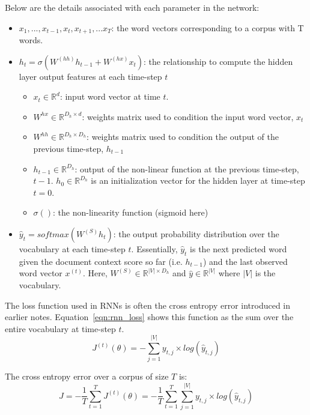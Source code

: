 \documentclass{tufte-handout}
\begin{document}
Below are the details associated with each parameter in the network:
\begin{itemize}
	\item $x_1, ..., x_{t-1}, x_t, x_{t+1}, ... x_{T}$: the word vectors corresponding to a corpus with T words.
	\item $h_t = \sigma(W^{(hh)} h_{t-1} + W^{(hx)} x_{t})$: the relationship to compute the hidden layer output features at each time-step $t$
	\begin{itemize}
		\item $x_{t} \in \mathbb{R}^{d}$: input word vector at time $t$. 
		\item $W^{hx} \in \mathbb{R}^{D_h \times d}$: weights matrix used to condition the input word vector, $x_t$
		\item $W^{hh} \in \mathbb{R}^{D_h \times D_h}$: weights matrix used to condition the output of the previous time-step, $h_{t-1}$
		\item $h_{t-1}  \in \mathbb{R}^{D_h}$: output of the non-linear function at the previous time-step, $t-1$. $h_0 \in \mathbb{R}^{D_h}$ is an initialization vector for the hidden layer at time-step $t = 0$.
		\item $\sigma ()$: the non-linearity function (sigmoid here)
	\end{itemize}
	\item $\hat{y}_t = softmax (W^{(S)}h_t)$: the output probability distribution over the vocabulary at each time-step $t$. Essentially, $\hat{y}_t$ is the next predicted word given the document context score so far (i.e. $h_{t-1}$) and the last observed word vector $x^{(t)}$. Here, $W^{(S)} \in \mathbb{R}^{|V| \times D_h}$ and $\hat{y} \in \mathbb{R}^{|V|}$ where $|V|$ is the vocabulary.
\end{itemize}

The loss function used in RNNs is often the cross entropy error introduced in earlier notes. Equation~\ref{eqn:rnn_loss} shows this function as the sum over the entire vocabulary at time-step $t$.
\begin{equation}
	J^{(t)}(\theta) = - \sum_{j=1}^{|V|} y_{t,j} \times log (\hat{y}_{t,j})
	\label {eqn:rnn_loss}
\end{equation}

The cross entropy error over a corpus of size $T$ is:
\begin{equation}
	J = - \dfrac{1}{T} \sum_{t=1}^{T} J^{(t)}(\theta) = - \dfrac{1}{T} \sum_{t=1}^{T} \sum_{j=1}^{|V|} y_{t,j} \times log (\hat{y}_{t,j})
	\label {eqn:rnn_loss_T}
\end{equation}
\end{document}
